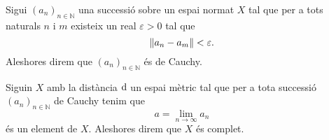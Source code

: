 \documentclass[../../Main.tex]{subfiles}
\begin{document}
	\begin{definition}
		\label{def:successió de Cauchy amb normes}
		Sigui \((a_{n})_{n\in\mathbb{N}}\) una successió sobre un espai normat \(X\) tal que per a tots naturals \(n\) i \(m\) existeix un real \(\varepsilon>0\) tal que
		\[
		    \norm{a_{n}-a_{m}}<\varepsilon.
		\]
		Aleshores direm que \((a_{n})_{n\in\mathbb{N}}\) és de Cauchy.
	\end{definition}
	\begin{definition}
		\label{def:espai mètric complet}
		Siguin \(X\) amb la distància \(\operatorname{d}\) un espai mètric tal que per a tota successió \((a_{n})_{n\in\mathbb{N}}\) de Cauchy tenim que
		\[
		    a=\lim_{n\to\infty}a_{n}
		\]
		és un element de \(X\).
		Aleshores direm que \(X\) és complet.
	\end{definition}
\end{document}
